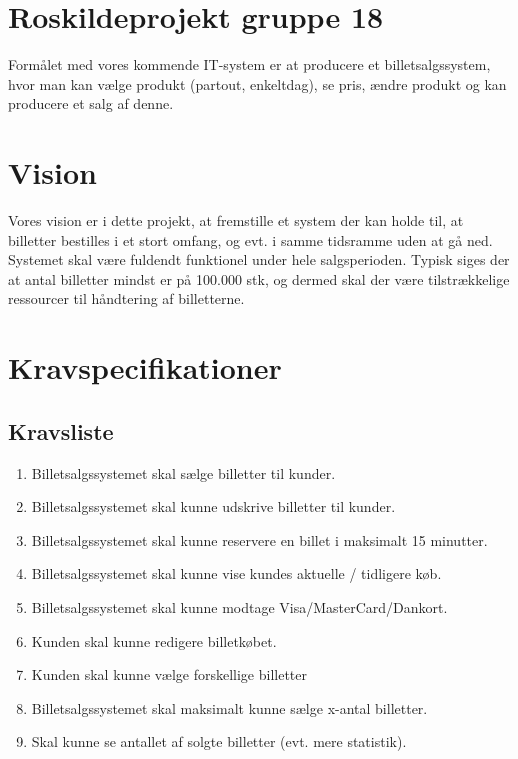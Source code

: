 


\section{Roskildeprojekt gruppe 18}
Formålet med vores kommende IT-system er at producere et billetsalgssystem, hvor man kan vælge produkt (partout, enkeltdag), se pris, ændre produkt og kan producere et salg af denne.

\section{Vision}
Vores vision er i dette projekt, at fremstille et system der kan holde til, at billetter bestilles i et stort omfang, og evt. i samme tidsramme uden at gå ned.
Systemet skal være fuldendt funktionel under hele salgsperioden.
Typisk siges der at antal billetter mindst er på 100.000 stk, og dermed skal der være tilstrækkelige ressourcer til håndtering af billetterne.\\

\section{Kravspecifikationer}

\subsection{Kravsliste}

\begin{enumerate}
    \item Billetsalgssystemet skal sælge billetter til kunder.
    \item Billetsalgssystemet skal kunne udskrive billetter til kunder.
    \item Billetsalgssystemet skal kunne reservere en billet i maksimalt 15 minutter.
    \item Billetsalgssystemet skal kunne vise kundes aktuelle / tidligere køb.
    \item Billetsalgssystemet skal kunne modtage Visa/MasterCard/Dankort.
    \item Kunden skal kunne redigere billetkøbet.
    \item Kunden skal kunne vælge forskellige billetter
    \item Billetsalgssystemet skal maksimalt kunne sælge x-antal billetter.
    \item Skal kunne se antallet af solgte billetter (evt. mere statistik).
\end{enumerate}


